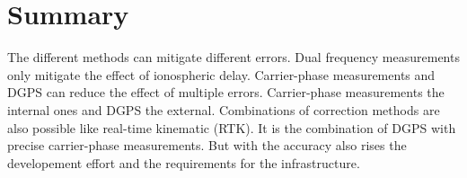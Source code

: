 \section{Summary}

The different methods can mitigate different errors.
Dual frequency measurements only mitigate the effect of ionospheric delay.
Carrier-phase measurements and DGPS can reduce the effect of multiple errors.
Carrier-phase measurements the internal ones and DGPS the external.
Combinations of correction methods are also possible like real-time kinematic (RTK).
It is the combination of DGPS with precise carrier-phase measurements.
But with the accuracy also rises the developement effort and the requirements for the infrastructure.